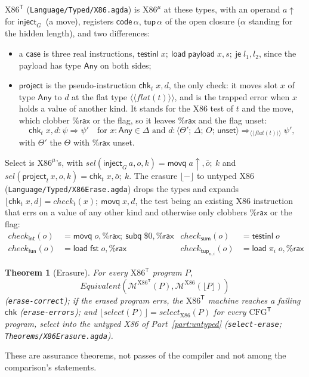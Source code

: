 \documentclass[10pt]{article}
\theoremstyle{acmplain}
\newtheorem{theorem}{Theorem}[section]
\newcommand{\key}[1]{\mathsf{#1}}
\newcommand{\pass}[1]{\mathit{#1}}
\newcommand{\Mach}[1]{\mathcal{M}^{#1}}
\newcommand{\Equiv}{\mathit{Equivalent}}
\newcommand{\rax}{\%\key{rax}}
\newcommand{\Tl}[1]{\textrm{#1}^{\mathsf{T}}}  %
\newcommand{\TAny}{\key{Any}}
\newcommand{\Tflat}[1]{\langle\!\langle #1 \rangle\!\rangle}  %
\newcommand{\Tfun}{\key{fun}}                  %
\newcommand{\Tsum}{\key{sum}}                  %
\newcommand{\Tint}{\key{int}}                  %
\newcommand{\Tttup}[2]{\key{tup}_{#1,#2}}      %
\newcommand{\Tflatof}[1]{\mathit{flat}(#1)}    %
\newcommand{\Tinject}[1]{\key{inject}_{#1}\,}
\newcommand{\Tproject}[1]{\key{project}_{#1}\,}
\newcommand{\Tcheck}[1]{\pass{check}_{#1}}     %
\newcommand{\Tst}[4]{\langle #1;\, #2;\, #3;\, #4 \rangle} %
\newcommand{\codeA}{\key{code}\,\alpha}                   %
\newcommand{\tupA}{\key{tup}\,\alpha}                     %
\newcommand{\Tup}[1]{#1{\uparrow}}                        %
\newcommand{\Tchk}[3]{\key{chk}_{#1}\; #2, #3}            %
\newcommand{\Tunset}{\key{unset}}
\newcommand{\Ml}[1]{\textrm{#1}^{\mu}}                  %
\begin{document}
$\Tl{X86}$ (\texttt{Language/Typed/X86.agda}) is $\Ml{X86}$ at these types,
with an operand $\Tup{a}$ for $\Tinject{G}$ (a move), registers
$\codeA$, $\tupA$ of the open closure ($\alpha$ standing for the hidden
length), and two differences:
\begin{itemize}
\item a $\key{case}$ is three real instructions, $\key{testinl}\; x;\
  \key{load}\; \key{payload}\; x, s;\ \key{je}\; l_1, l_2$, since the payload
  has type $\TAny$ on both sides;
\item $\key{project}$ is the pseudo-instruction $\Tchk{t}{x}{d}$, the only
  check: it moves slot $x$ of type $\TAny$ to $d$ at the flat type
  $\Tflat{\Tflatof{t}}$, and is the trapped error when $x$ holds a value of
  another kind. It stands for the X86 test of $t$ and the move, which
  clobber $\rax$ or the flag, so it leaves $\rax$ and the flag unset:
  \[
    \Tchk{t}{x}{d} : \psi \Rightarrow \psi' \quad\text{for } x : \TAny \in \Delta \text{ and }
    d : \Tst{\Theta'}{\Delta}{O}{\Tunset} \Rightarrow_{\Tflat{\Tflatof{t}}} \psi' ,
  \]
  with $\Theta'$ the $\Theta$ with $\rax$ unset.
\end{itemize}
Select is $\Ml{X86}$'s, with $\pass{sel}(\Tinject{G} a, o, k) = \key{movq}\;
\Tup{a}, \bar{o};\ k$ and $\pass{sel}(\Tproject{t} x, o, k) = \Tchk{t}{x}{\bar{o}};\ k$.
The erasure $\lfloor - \rfloor$ to untyped X86
(\texttt{Language/Typed/X86Erase.agda}) drops the types and expands
$\lfloor \Tchk{t}{x}{d} \rfloor = \Tcheck{t}(x);\ \key{movq}\; x, d$, the test
being an existing X86 instruction that errs on a value of any other kind
and otherwise only clobbers $\rax$ or the flag:
\begin{align*}
  \Tcheck{\Tint}(o) &= \key{movq}\; o, \rax;\ \key{subq}\; \$0, \rax &
  \Tcheck{\Tsum}(o) &= \key{testinl}\; o \\
  \Tcheck{\Tfun}(o) &= \key{load}\; \key{fst}\; o, \rax &
  \Tcheck{\Tttup{n}{i}}(o) &= \key{load}\; \pi_i\; o, \rax
\end{align*}
\begin{theorem}[Erasure]\label{thm:t-erase}
For every $\Tl{X86}$ program $P$,
\[ \Equiv(\Mach{\Tl{X86}}(P), \Mach{\mathrm{X86}}(\lfloor P \rfloor)) \]
(\texttt{erase-correct}); if the erased program errs, the $\Tl{X86}$ machine
reaches a failing $\key{chk}$ (\texttt{erase-errors}); and
$\lfloor \pass{select}(P) \rfloor = \pass{select}_{\mathrm{X86}}(P)$ for every
$\Tl{CFG}$ program, select into the untyped X86 of Part~\ref{part:untyped}
(\texttt{select-erase}; \texttt{Theorems/X86Erasure.agda}).
\end{theorem}
These are assurance theorems, not passes of the compiler and not among the
comparison's statements.
\end{document}
